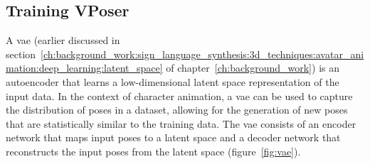 \documentclass[../../main.tex]{subfiles}
\begin{document}
\subsection{Training VPoser}
\label{ch:pose_correction:pose_correction_with_azee:training}

A \gls{vae} (earlier discussed in section~\ref{ch:background_work:sign_language_synthesis:3d_techniques:avatar_animation:deep_learning:latent_space} of chapter~\ref{ch:background_work}) is an autoencoder that learns a low-dimensional latent space representation of the input data. In the context of character animation, a \gls{vae} can be used to capture the distribution of poses in a dataset, allowing for the generation of new poses that are statistically similar to the training data. The \gls{vae} consists of an encoder network that maps input poses to a latent space and a decoder network that reconstructs the input poses from the latent space (figure~\ref{fig:vae}).
\end{document}

